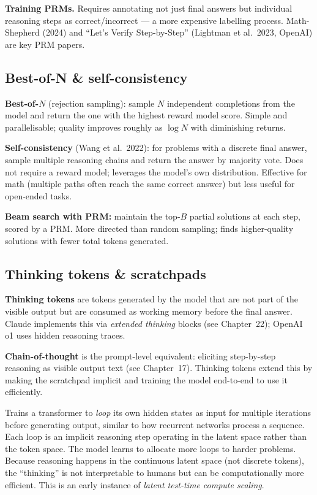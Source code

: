 \textbf{Training PRMs.} Requires annotating not just final answers but individual
reasoning steps as correct/incorrect --- a more expensive labelling process. Math-
Shepherd (2024) and ``Let's Verify Step-by-Step'' (Lightman et al.\ 2023, OpenAI) are
key PRM papers.

\subsection{Best-of-N \& self-consistency}

\textbf{Best-of-$N$} (rejection sampling): sample $N$ independent completions from the
model and return the one with the highest reward model score. Simple and parallelisable;
quality improves roughly as $\log N$ with diminishing returns.

\textbf{Self-consistency} (Wang et al.\ 2022): for problems with a discrete final
answer, sample multiple reasoning chains and return the answer by majority vote.
Does not require a reward model; leverages the model's own distribution. Effective for
math (multiple paths often reach the same correct answer) but less useful for open-ended
tasks.

\textbf{Beam search with PRM:} maintain the top-$B$ partial solutions at each step,
scored by a PRM. More directed than random sampling; finds higher-quality solutions
with fewer total tokens generated.

\subsection{Thinking tokens \& scratchpads}

\textbf{Thinking tokens} are tokens generated by the model that are not part of the
visible output but are consumed as working memory before the final answer. Claude
implements this via \emph{extended thinking} blocks (see Chapter~22); OpenAI o1 uses
hidden reasoning traces.

\textbf{Chain-of-thought} is the prompt-level equivalent: eliciting step-by-step
reasoning as visible output text (see Chapter~17). Thinking tokens extend this by
making the scratchpad implicit and training the model end-to-end to use it efficiently.

\begin{paperbox}[title={Ouro: Scaling Latent Reasoning via Looped Language Models (2025)}]
  Trains a transformer to \emph{loop} its own hidden states as input for multiple
  iterations before generating output, similar to how recurrent networks process
  a sequence. Each loop is an implicit reasoning step operating in the latent
  space rather than the token space. The model learns to allocate more loops to
  harder problems. Because reasoning happens in the continuous latent space (not
  discrete tokens), the ``thinking'' is not interpretable to humans but can be
  computationally more efficient. This is an early instance of \emph{latent
  test-time compute scaling}.
\end{paperbox}

